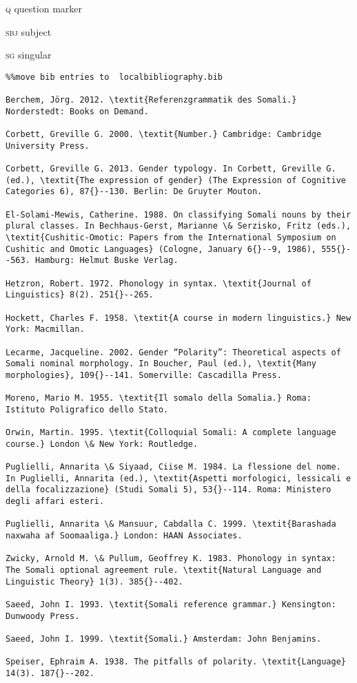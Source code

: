 \documentclass[output=paper]{langsci/langscibook}
\begin{document}
\textsc{q  }question marker

\textsc{sbj}  subject

\textsc{sg}  singular

\begin{verbatim}%%move bib entries to  localbibliography.bib

Berchem, Jörg. 2012. \textit{Referenzgrammatik des Somali.} Norderstedt: Books on Demand.

Corbett, Greville G. 2000. \textit{Number.} Cambridge: Cambridge University Press.

Corbett, Greville G. 2013. Gender typology. In Corbett, Greville G. (ed.), \textit{The expression of gender} (The Expression of Cognitive Categories 6), 87{}--130. Berlin: De Gruyter Mouton. 

El-Solami-Mewis, Catherine. 1988. On classifying Somali nouns by their plural classes. In Bechhaus-Gerst, Marianne \& Serzisko, Fritz (eds.), \textit{Cushitic-Omotic: Papers from the International Symposium on Cushitic and Omotic Languages} (Cologne, January 6{}--9, 1986), 555{}--563. Hamburg: Helmut Buske Verlag.

Hetzron, Robert. 1972. Phonology in syntax. \textit{Journal of Linguistics} 8(2). 251{}--265. 

Hockett, Charles F. 1958. \textit{A course in modern linguistics.} New York: Macmillan.

Lecarme, Jacqueline. 2002. Gender “Polarity”: Theoretical aspects of Somali nominal morphology. In Boucher, Paul (ed.), \textit{Many morphologies}, 109{}--141. Somerville: Cascadilla Press.

Moreno, Mario M. 1955. \textit{Il somalo della Somalia.} Roma: Istituto Poligrafico dello Stato.

Orwin, Martin. 1995. \textit{Colloquial Somali: A complete language course.} London \& New York: Routledge.

Puglielli, Annarita \& Siyaad, Ciise M. 1984. La flessione del nome. In Puglielli, Annarita (ed.), \textit{Aspetti morfologici, lessicali e della focalizzazione} (Studi Somali 5), 53{}--114. Roma: Ministero degli affari esteri. 

Puglielli, Annarita \& Mansuur, Cabdalla C. 1999. \textit{Barashada naxwaha af Soomaaliga.} London: HAAN Associates.

Zwicky, Arnold M. \& Pullum, Geoffrey K. 1983. Phonology in syntax: The Somali optional agreement rule. \textit{Natural Language and Linguistic Theory} 1(3). 385{}--402.

Saeed, John I. 1993. \textit{Somali reference grammar.} Kensington: Dunwoody Press.

Saeed, John I. 1999. \textit{Somali.} Amsterdam: John Benjamins. 

Speiser, Ephraim A. 1938. The pitfalls of polarity. \textit{Language} 14(3). 187{}--202.


\end{verbatim}
 

\printbibliography[heading=subbibliography,notkeyword=this]
\end{document}
